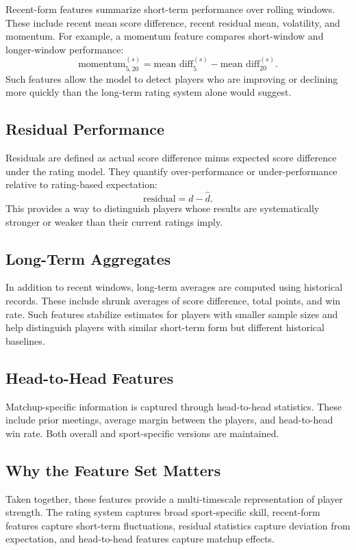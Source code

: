 \documentclass[10pt,twocolumn]{article}
\begin{document}
Recent-form features summarize short-term performance over rolling windows. These include recent mean score difference, recent residual mean, volatility, and momentum. For example, a momentum feature compares short-window and longer-window performance:
\[
    \text{momentum}^{(s)}_{5,20}
    =
    \text{mean diff}^{(s)}_{5}
    -
    \text{mean diff}^{(s)}_{20}.
\]
Such features allow the model to detect players who are improving or declining more quickly than the long-term rating system alone would suggest.

\subsection{Residual Performance}

Residuals are defined as actual score difference minus expected score difference under the rating model. They quantify over-performance or under-performance relative to rating-based expectation:
\[
    \text{residual} = d - \hat d.
\]
This provides a way to distinguish players whose results are systematically stronger or weaker than their current ratings imply.

\subsection{Long-Term Aggregates}

In addition to recent windows, long-term averages are computed using historical records. These include shrunk averages of score difference, total points, and win rate. Such features stabilize estimates for players with smaller sample sizes and help distinguish players with similar short-term form but different historical baselines.

\subsection{Head-to-Head Features}

Matchup-specific information is captured through head-to-head statistics. These include prior meetings, average margin between the players, and head-to-head win rate. Both overall and sport-specific versions are maintained.

\subsection{Why the Feature Set Matters}

Taken together, these features provide a multi-timescale representation of player strength. The rating system captures broad sport-specific skill, recent-form features capture short-term fluctuations, residual statistics capture deviation from expectation, and head-to-head features capture matchup effects.
\end{document}
